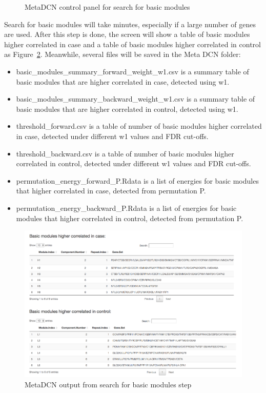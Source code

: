 \begin{figure}[H]
\begin{center}
\caption{MetaDCN control panel for search for basic modules}
\label{fig:metaDCNstep2}
\end{center}
\end{figure}

Search for basic modules will take minutes, especially if a large number of genes are used. After this step is done, the screen will show a table of basic modules higher correlated in case and a table of basic modules higher correlated in control as Figure~\ref{fig:metaDCNBM}. Meanwhile, several files will be saved in the Meta DCN folder:

\begin{itemize}
 \item basic\_modules\_summary\_forward\_weight\_w1.csv is a summary table of basic modules that are higher correlated in case, detected using w1.
 \item basic\_modules\_summary\_backward\_weight\_w1.csv is a summary table of basic modules that are higher correlated in control, detected using w1.
\item threshold\_forward.csv is a table of number of basic modules higher correlated in case, detected under different w1 values and FDR cut-offs.
\item threshold\_backward.csv is a table of number of basic modules higher correlated in control, detected under different w1 values and FDR cut-offs.
 \item permutation\_energy\_forward\_P.Rdata is a list of energies for basic modules that higher correlated in case, detected from permutation P.
  \item permutation\_energy\_backward\_P.Rdata is a list of energies for basic modules that higher correlated in control, detected from permutation P.
\end{itemize}

\begin{figure}[H]
\begin{center}
\includegraphics[scale=0.8]{./figure/metaDCN/metaDCNBM}
\caption{MetaDCN output from search for basic modules step}
\label{fig:metaDCNBM}
\end{center}
\end{figure}


